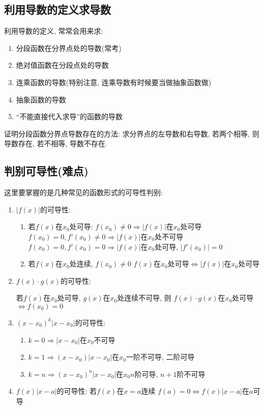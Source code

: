 \subsection{利用导数的定义求导数}
利用导数的定义, 常常会用来求:
\begin{enumerate}
\item 分段函数在分界点处的导数(常考)
\item 绝对值函数在分段点处的导数
\item 连乘函数的导数(特别注意, 连乘导数有时候要当做抽象函数做)
\item 抽象函数的导数
\item ``不能直接代入求导''的函数的导数
\end{enumerate}\par
证明分段函数分界点导数存在的方法: 求分界点的左导数和右导数, 若两个相等, 则导数存在, 若不相等, 导数不存在.
\subsection{判别可导性(难点)}
这里要掌握的是几种常见的函数形式的可导性判别:
\begin{enumerate}
\item $ |f(x)| $的可导性:
\begin{enumerate}
\item 若$ f(x) $在$ x_{0} $处可导:
\subitem $ f(x_{0})\neq 0 \Rightarrow |f(x)| $在$ x_{0} $处可导
\subitem $ f(x_{0})=0, f'(x_{0})\neq 0 \Rightarrow |f(x)| $在$ x_{0} $处不可导
\subitem $ f(x_{0})=0, f'(x_{0})=0 \Rightarrow |f(x)| $在$ x_{0} $处可导, $ |f'(x_{0})|=0 $
\item 若$ f(x) $在$ x_{0} $处连续, $ f(x_{0})\neq 0 $
\subitem $ f(x) $在$ x_{0} $处可导$ \Leftrightarrow |f(x)| $在$ x_{0} $处可导
\end{enumerate}
\item $ f(x)\cdot g(x) $的可导性: \par 若$ f(x) $在$ x_{0} $处可导, $ g(x) $在$ x_{0} $处连续不可导, 则
\subitem $ f(x)\cdot g(x) $在$ x_{0} $处可导$ \Leftrightarrow f(x_{0})=0 $
\item $ (x-x_{0})^{k}|x-x_{0}| $的可导性:
\begin{enumerate}
\item $ k=0 \Rightarrow |x-x_{0}| $在$ x_{0} $不可导
\item $ k=1 \Rightarrow (x-x_{0})|x-x_{0}| $在$ x_{0} $一阶不可导, 二阶可导
\item $ k=n \Rightarrow (x-x_{0})^{n}|x-x_{0}| $在$ x_{0} $$ n $阶可导, $ n+1 $阶不可导
\end{enumerate}
\item $ f(x)|x-a| $的可导性: 若$ f(x) $在$ x=a $连续
\subitem $ f(a)=0\Leftrightarrow f(x)|x-a| $在$ a $可导
\end{enumerate}
